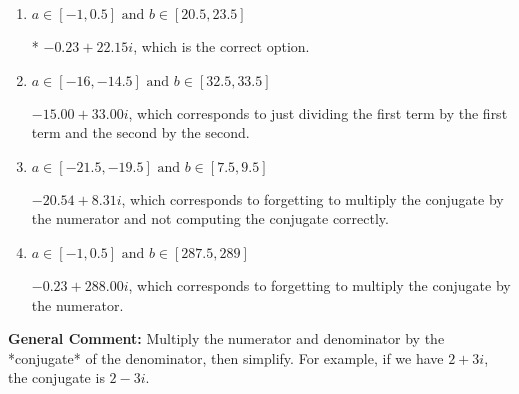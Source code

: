 \documentclass{extbook}[14pt]
\begin{document}
\begin{enumerate}
{\begin{enumerate}[label=\Alph*.]
 $-3.00  + 22.15 i$, which corresponds to forgetting to multiply the conjugate by the numerator and using a plus instead of a minus in the denominator.
\item \( a \in [-1, 0.5] \text{ and } b \in [20.5, 23.5] \)

* $-0.23  + 22.15 i$, which is the correct option.
\item \( a \in [-16, -14.5] \text{ and } b \in [32.5, 33.5] \)

 $-15.00  + 33.00 i$, which corresponds to just dividing the first term by the first term and the second by the second.
\item \( a \in [-21.5, -19.5] \text{ and } b \in [7.5, 9.5] \)

 $-20.54  + 8.31 i$, which corresponds to forgetting to multiply the conjugate by the numerator and not computing the conjugate correctly.
\item \( a \in [-1, 0.5] \text{ and } b \in [287.5, 289] \)

 $-0.23  + 288.00 i$, which corresponds to forgetting to multiply the conjugate by the numerator.
\end{enumerate}

\textbf{General Comment:} Multiply the numerator and denominator by the *conjugate* of the denominator, then simplify. For example, if we have $2+3i$, the conjugate is $2-3i$.
}
\end{enumerate}
\end{document}
